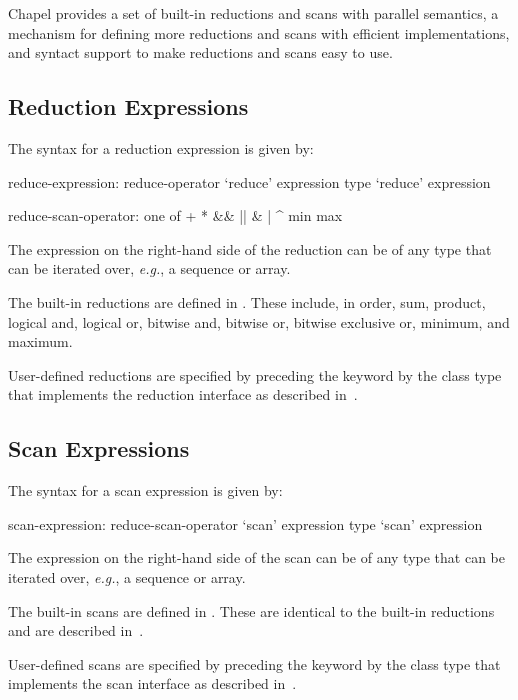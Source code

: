 \label{Reductions_and_Scans}

Chapel provides a set of built-in reductions and scans with parallel
semantics, a mechanism for defining more reductions and scans with
efficient implementations, and syntact support to make reductions and
scans easy to use.

\subsection{Reduction Expressions}
\label{reduce}

The syntax for a reduction expression is given by:
\begin{syntax}
reduce-expression:
  reduce-operator `reduce' expression
  type `reduce' expression

reduce-scan-operator: one of
  + * && || & | ^ min max
\end{syntax}

The expression on the right-hand side of the reduction can be of any
type that can be iterated over, {\em e.g.}, a sequence or array.

The built-in reductions are defined in .  These
include, in order, sum, product, logical and, logical or, bitwise and,
bitwise or, bitwise exclusive or, minimum, and maximum.

User-defined reductions are specified by preceding the
keyword  by the class type that implements the reduction
interface as described in~.

\subsection{Scan Expressions}
\label{scan}

The syntax for a scan expression is given by:
\begin{syntax}
scan-expression:
  reduce-scan-operator `scan' expression
  type `scan' expression
\end{syntax}

The expression on the right-hand side of the scan can be of any
type that can be iterated over, {\em e.g.}, a sequence or array.

The built-in scans are defined in .  These
are identical to the built-in reductions and are described
in~.

User-defined scans are specified by preceding the keyword 
by the class type that implements the scan interface as described
in~.

